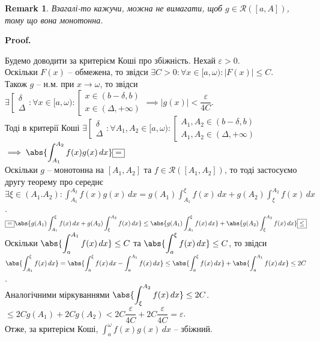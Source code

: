 \documentclass[a4paper, 10pt]{article}
\makeatletter
\def\huge{\displaystyle}
\def\qed{$\blacksquare$}
\theoremstyle{theoremdd}
\theoremstyle{theoremdd}
\theoremstyle{theoremdd}
\theoremstyle{theoremdd}
\theoremstyle{theoremdd}
\theoremstyle{theoremdd}
\theoremstyle{theoremdd}
\newtheorem{remark}[theorem]{Remark}
\theoremstyle{theoremdd}
\theoremstyle{theoremdd}
\renewenvironment{proof}[1][Proof.\\]{\par
\pushQED{\hfill \qed}%
\normalfont \topsep6\p@\@plus6\p@\relax
\trivlist
\item\relax
{\bfseries
#1\@addpunct{.}}\hspace\labelsep\ignorespaces
}{%
\popQED\endtrivlist\@endpefalse
}
\makeatother
\begin{document}
\begin{remark}
Взагалі-то кажучи, можна не вимагати, щоб $g \in \mathcal{R}([a,A])$, тому що вона монотонна.
\end{remark}

\begin{proof}
Будемо доводити за критерієм Коші про збіжність. Нехай $\varepsilon > 0$.\\
Оскільки $F(x)$ -- обмежена, то звідси $\exists C > 0: \forall x \in [a,\omega): |F(x)| \leq C$.\\
Також $g$ -- н.м. при $x \to \omega$, то звідси $\exists \left[ \begin{gathered} \delta \\ \Delta \end{gathered} \right.: \forall x \in [a,\omega): \left[ \begin{gathered} x \in (b-\delta,b) \\ x \in (\Delta,+\infty) \end{gathered} \right. \implies |g(x)| < \dfrac{\varepsilon}{4C}$.\\
Тоді в критерії Коші $\exists \left[ \begin{gathered} \delta \\ \Delta \end{gathered} \right.: \forall A_1,A_2 \in [a,\omega): \left[ \begin{gathered} A_1,A_2 \in (b-\delta,b) \\ A_1,A_2 \in (\Delta,+\infty) \end{gathered} \right.$\\
$\huge\implies \abs{\int_{A_1}^{A_2} f(x)g(x)\,dx} \boxed{=}$\\
Оскільки $g$ -- монотонна на $[A_1,A_2]$ та $f \in \mathcal{R}([A_1,A_2])$, то тоді застосуємо другу теорему про середнє\\
$\exists \xi \in (A_1.A_2): \huge\int_{A_1}^{A_2} f(x)g(x)\,dx = g(A_1) \int_{A_1}^{\xi} f(x)\,dx + g(A_2) \int_{\xi}^{A_2} f(x)\,dx$.\\
$\huge\boxed{=} \abs{g(A_1) \int_{A_1}^{\xi} f(x)\,dx + g(A_2) \int_{\xi}^{A_2} f(x)\,dx} \leq \abs{g(A_1) \int_{A_1}^{\xi} f(x)\,dx} + \abs{g(A_2) \int_{\xi}^{A_2} f(x)\,dx} \boxed{\leq}$\\
Оскільки $\abs{\huge\int_a^{A_1} f(x)\,dx} \leq C$ та $\abs{\huge\int_a^{\xi} f(x)\,dx} \leq C$, то звідси \\ $\huge\abs{\int_{A_1}^{\xi} f(x)\,dx} = \abs{\int_{a}^{\xi} f(x)\,dx - \int_{a}^{A_1}f(x)\,dx} \leq \abs{\int_a^\xi f(x)\,dx} + \abs{\int_a^{A_1} f(x)\,dx} \leq 2C$.\\
Аналогічними міркуваннями $\huge\abs{\int_{\xi}^{A_2} f(x)\,dx} \leq 2C$.\\
$\boxed{\leq} 2C g(A_1) + 2C g(A_2) < 2C \dfrac{\varepsilon}{4C} + 2C \dfrac{\varepsilon}{4C} = \varepsilon$.\\
Отже, за критерієм Коші, $\huge\int_a^\omega f(x)g(x)\,dx$ -- збіжний.
\end{proof}
\end{document}
